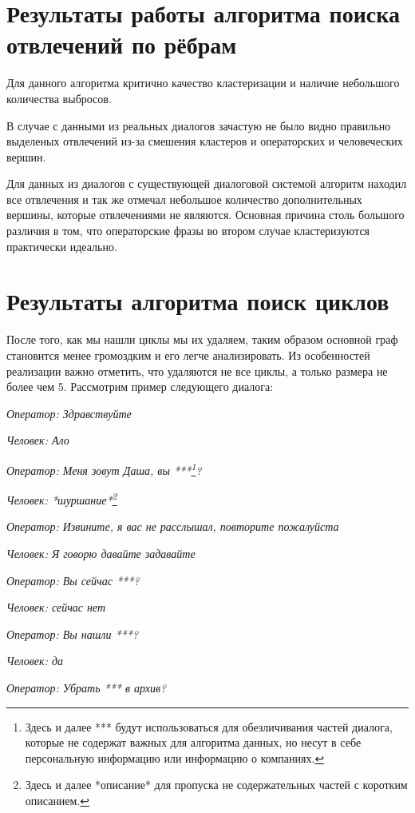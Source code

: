 \documentclass[specification,annotation]{itmo-student-thesis}
\begin{document}
	\section{Результаты работы алгоритма поиска отвлечений по рёбрам}
	Для данного алгоритма критично качество кластеризации и наличие небольшого количества выбросов. 
		
	В случае с данными из реальных диалогов зачастую не было видно правильно выделеных отвлечений из-за смешения кластеров и операторских и человеческих вершин.
		
	Для данных из диалогов с существующей диалоговой системой алгоритм находил все отвлечения и так же отмечал небольшое количество дополнительных вершины, которые отвлечениями не являются. Основная причина столь большого различия в том, что операторские фразы во втором случае кластеризуются практически идеально.
	
	\section{Результаты алгоритма поиск циклов}
	После того, как мы нашли циклы мы их удаляем, таким образом основной граф становится менее громоздким и его легче анализировать. Из особенностей реализации важно отметить, что удаляются не все циклы, а только размера не более чем 5. Рассмотрим пример следующего диалога:
	
	\textit{Оператор: Здравствуйте}
	
	\textit{Человек:  Ало}
	
	\textit{Оператор:  Меня зовут Даша, вы ***\footnote{Здесь и далее *** будут использоваться для обезличивания частей диалога, которые не содержат важных для алгоритма данных, но несут в себе персональную информацию или информацию о компаниях.}?}
	
	\textit{Человек:  *шуршание*\footnote{Здесь и далее *описание* для пропуска не содержательных частей с коротким описанием.}}
	
	\textit{Оператор:  Извините, я вас не расслышал, повторите пожалуйста}
	
	\textit{Человек:  Я говорю давайте задавайте}
	
	\textit{Оператор:  Вы сейчас ***?}
	
	\textit{Человек:  сейчас нет}
	
	\textit{Оператор:  Вы нашли ***?}
	
	\textit{Человек:  да}
	
	\textit{Оператор:  Убрать *** в архив?}
	
\end{document}

